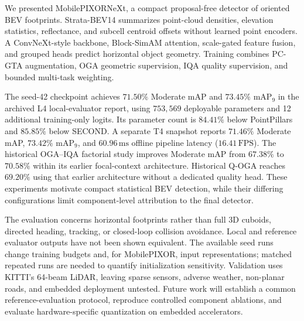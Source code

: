 We presented MobilePIXORNeXt, a compact proposal-free detector of oriented BEV footprints. Strata-BEV14 summarizes point-cloud densities, elevation statistics, reflectance, and subcell centroid offsets without learned point encoders. A ConvNeXt-style backbone, Block-SimAM attention, scale-gated feature fusion, and grouped heads predict horizontal object geometry. Training combines PC-GTA augmentation, OGA geometric supervision, IQA quality supervision, and bounded multi-task weighting.

The seed-42 checkpoint achieves $71.50\%$ Moderate mAP and $73.45\%$ $\text{mAP}_9$ in the archived L4 local-evaluator report, using $753{,}569$ deployable parameters and 12 additional training-only logits. Its parameter count is $84.41\%$ below PointPillars and $85.85\%$ below SECOND. A separate T4 snapshot reports $71.46\%$ Moderate mAP, $73.42\%$ $\text{mAP}_9$, and $60.96\,\text{ms}$ offline pipeline latency ($16.41\,\text{FPS}$). The historical OGA--IQA factorial study improves Moderate mAP from $67.38\%$ to $70.58\%$ within its earlier focal-context architecture. Historical Q-OGA reaches $69.20\%$ using that earlier architecture without a dedicated quality head. These experiments motivate compact statistical BEV detection, while their differing configurations limit component-level attribution to the final detector.

The evaluation concerns horizontal footprints rather than full 3D cuboids, directed heading, tracking, or closed-loop collision avoidance. Local and reference evaluator outputs have not been shown equivalent. The available seed runs change training budgets and, for MobilePIXOR, input representations; matched repeated runs are needed to quantify initialization sensitivity. Validation uses KITTI's 64-beam LiDAR, leaving sparse sensors, adverse weather, non-planar roads, and embedded deployment untested. Future work will establish a common reference-evaluation protocol, reproduce controlled component ablations, and evaluate hardware-specific quantization on embedded accelerators.

